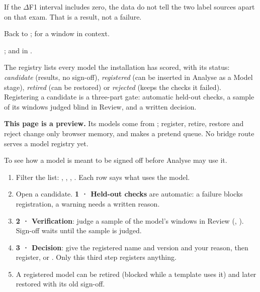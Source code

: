 \begin{watchout}
If the \(\Delta\)F1 interval includes zero, the data do not tell the two label sources apart on that
exam. That is a result, not a failure.
\end{watchout}

Back to ;  for a window in context.

\begin{underthehood}
;  and
 in .
\end{underthehood}

The registry lists every model the installation has scored, with its status: \emph{candidate}
(results, no sign-off), \emph{registered} (can be inserted in Analyse as a Model stage),
\emph{retired} (can be restored) or \emph{rejected} (keeps the checks it failed). Registering a
candidate is a three-part gate: automatic held-out checks, a sample of its windows judged blind in
Review, and a written decision.

\textbf{This page is a preview.} Its models come from ;
register, retire, restore and reject change only browser memory, and  makes
a pretend queue. No bridge route serves a model registry yet.

To see how a model is meant to be signed off before Analyse may use it.


\begin{enumerate}
  \item Filter the list: , , , . Each row says what
        uses the model.
  \item Open a candidate. \textbf{1 · Held-out checks} are automatic: a failure blocks registration,
        a warning needs a written reason.
  \item \textbf{2 · Verification}: judge a sample of the model's windows in Review (, ). Sign-off waits until the sample is judged.
  \item \textbf{3 · Decision}: give the registered name and version and your reason, then register, or
        . Only this third step registers anything.
  \item A registered model can be retired (blocked while a template uses it) and later restored with
        its old sign-off.
\end{enumerate}

